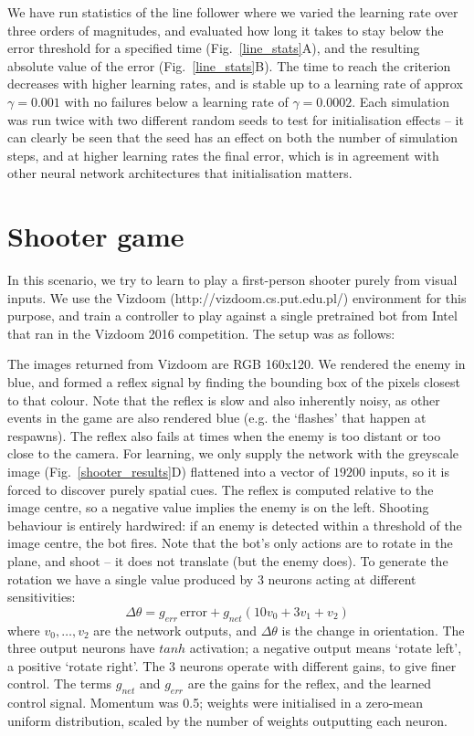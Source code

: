 \documentclass[Afour,sageh,times]{sagej}
\begin{document}
We have run statistics of the line follower where we varied the
learning rate over three orders of magnitudes, and evaluated how long
it takes to stay below the error threshold for a specified time
(Fig.~\ref{line_stats}A), and the resulting absolute value of the
error (Fig.~\ref{line_stats}B). The time to reach the criterion
decreases with higher learning rates, and is stable up to a learning
rate of approx $\gamma = 0.001$ with no failures below a learning rate of
$\gamma = 0.0002$. Each simulation was run twice with two different random seeds to
test for initialisation effects -- it can clearly be seen that
the seed has an effect on both the number of simulation steps,
and at higher learning rates the final error, which is in agreement with other neural
network architectures that initialisation matters.


\section{Shooter game}
In this scenario, we try to learn to play a first-person shooter
purely from visual inputs. We use the Vizdoom
(http://vizdoom.cs.put.edu.pl/) environment for this purpose, and
train a controller to play against a single pretrained bot from Intel
that ran in the Vizdoom 2016 competition. The setup was as follows:

The images returned from Vizdoom are RGB 160x120. We rendered the
enemy in blue, and formed a reflex signal by finding the bounding box
of the pixels closest to that colour. Note that the reflex is slow and
also inherently noisy, as other events in the game are also rendered
blue (e.g. the ‘flashes’ that happen at respawns). The reflex also
fails at times when the enemy is too distant or too close to the
camera. For learning, we only supply the network with the greyscale
image (Fig.~\ref{shooter_results}D) flattened into a vector of $19200$
inputs, so it is forced to discover purely spatial cues. The reflex is
computed relative to the image centre, so a negative value implies the
enemy is on the left. Shooting behaviour is entirely hardwired: if an
enemy is detected within a threshold of the image centre, the bot
fires. Note that the bot's only actions are to rotate in the plane,
and shoot -- it does not translate (but the enemy does). To generate
the rotation we have a single value produced by 3 neurons acting at
different sensitivities:
\begin{equation}
\Delta \theta = g_{err}\, \mathrm{error} + g_{net} \left( 10 v_0 + 3 v_1 + v_2 \right)
\end{equation}
where $v_0, \ldots, v_2$ are the network outputs, and $\Delta \theta$
is the change in orientation. The three output neurons have $tanh$ activation; a
negative output means ‘rotate left’, a positive ‘rotate right’. The 3
neurons operate with different gains, to give finer control. The terms
$g_{net}$ and $g_{err}$ are the gains for the reflex, and the learned
control signal. Momentum was 0.5; weights were initialised in a zero-mean
uniform distribution, scaled by the number of weights outputting each
neuron.
\end{document}
